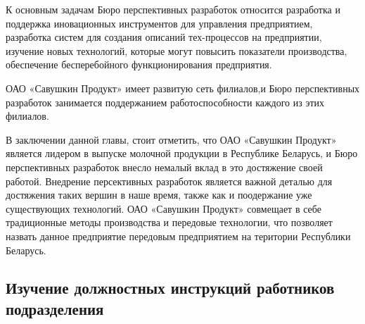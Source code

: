 {  \par \redline К основным задачам Бюро перспективных разработок относится разработка и поддержка иновационных инструментов для управления предприятием, разработка систем для создания описаний тех-процессов на предприятии, изучение новых технологий, которые могут повысить показатели производства, обеспечение бесперебойного функционирования предприятия. 
  
  \par \redline ОАО «Савушкин Продукт» имеет развитую сеть филиалов,и Бюро перспективных разработок занимается поддержанием работоспособности каждого из этих филиалов.
 

  \par \redline В заключении данной главы, стоит отметить, что ОАО «Савушкин Продукт» является лидером в выпуске молочной продукции в Республике Беларусь, и Бюро перспективных разработок внесло немалый вклад в это достяжение своей работой. Внедрение персективных разработок является важной деталью для достяжения таких вершин в наше время, также как и поодержание уже существующих технологий. ОАО «Савушкин Продукт» совмещает в себе традиционные методы производства и передовые технологии, что позволяет назвать данное предприятие передовым предприятием на територии Республики Беларусь. 

  \par
}

\subtitlespace

\subsection*{ 
  \gostTitleFont
   Изучение должностных инструкций работников подразделения
} 

\subtitlespace

